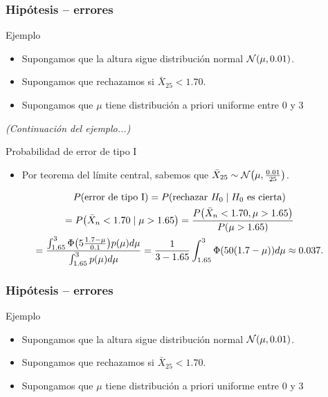 \documentclass[table]{beamer}
\begin{document}
\begin{frame}
    \frametitle{Hipótesis -- errores}
    \begin{exampleblock}{Ejemplo}
        \begin{itemize}
            \item Supongamos que la altura sigue distribución normal $\normal{\mu}{0.01}$.
            \item Supongamos que rechazamos si $\bar{X}_{25} < 1.70$.
            \item Supongamos que $\mu$ tiene distribución a priori uniforme entre $0$ y $3$
        \end{itemize}
    \end{exampleblock}

\end{frame}

\begin{frame}
	\textit{(Continuación del ejemplo...)}
    \begin{block}{Probabilidad de error de tipo I}
        \begin{itemize}
            \item Por teorema del límite central, sabemos que $\bar{X}_{25} \sim \normal{\mu}{\frac{0.01}{25}}$.
        \end{itemize}
        \begin{multline*}
            \prob{\text{error de tipo I}}
            = \prob{\text{rechazar } H_{0} \mid H_{0} \text{ es cierta}}
            \\
            = \prob{\bar{X}_{n} < 1.70 \mid \mu > 1.65}
            = \frac{\prob{\bar{X}_{n} < 1.70 , \mu > 1.65}}{\prob{\mu > 1.65}}
            \\
            = \frac{\int_{1.65}^{3} \phifunc{5 \frac{1.7 - \mu}{0.1}} \pdf{\mu} d \mu}{\int_{1.65}^{3} \pdf{\mu} d \mu}
            = \frac{1}{3 - 1.65} \int_{1.65}^{3} \phifunc{50 \parens{1.7 - \mu}} d \mu \approx 0.037 .
        \end{multline*}
    \end{block}

\end{frame}

\begin{frame}
    \frametitle{Hipótesis -- errores}
    \begin{exampleblock}{Ejemplo}
        \begin{itemize}
            \item Supongamos que la altura sigue distribución normal $\normal{\mu}{0.01}$.
            \item Supongamos que rechazamos si $\bar{X}_{25} < 1.70$.
            \item Supongamos que $\mu$ tiene distribución a priori uniforme entre $0$ y $3$
        \end{itemize}
    \end{exampleblock}
    
\end{frame}
\end{document}
